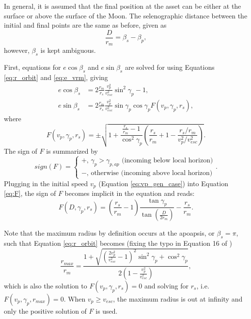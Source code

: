 \documentclass{article}
\begin{document}
In general, it is assumed that the final position at the asset can be either at the surface or above the surface of the Moon. The selenographic distance between the initial and final points are the same as before, given as
\begin{equation}\label{eq:D_beta_gen}
\frac{D}{r_m} = \beta_s - \beta_p,
\end{equation}
however, $\beta_s$ is kept ambiguous.

First, equations for $e\cos\beta_s$ and $e\sin\beta_s$ are solved for using Equations \eqref{eq:r_orbit} and \eqref{eq:e_vrm}, giving
\begin{align}\label{eq:ecosbetas}
e\cos\beta_s &= 2\frac{r_m}{r_s}\frac{v_p^2}{v_{esc}^2}\sin^2\gamma_p - 1,\\
e\sin\beta_s &= 2\frac{r_m}{r_s}\frac{v_p^2}{v_{esc}^2}\sin\gamma_p\cos\gamma_p F(v_p,\gamma_p,r_s), \label{eq:esinbetas}
\end{align}
where
\begin{equation}\label{eq:F}
F(v_p,\gamma_p,r_s) = \pm\sqrt{1 + \frac{\frac{r_s}{r_m}-1}{\cos^2\gamma_p}\left(\frac{r_s}{r_m}+1-\frac{r_s/r_m}{v_p^2/v_{esc}^2}\right)}.
\end{equation}
The sign of $F$ is summarized by
\begin{equation}\label{eq:sign of F} %
sign(F) = \begin{cases}
+ \text{, $\gamma_p > \gamma_{p,ap}$ (incoming below local horizon)}\\
- \text{, otherwise (incoming above local horizon)}
\end{cases}.
\end{equation}
Plugging in the initial speed $v_p$ (Equation \eqref{eq:vp_gen_case}) into Equation \eqref{eq:F}, the sign of $F$ becomes implicit in the equation and reads:
\begin{equation}
F(D,\gamma_p,r_s) = \left(\frac{r_s}{r_m}-1\right)\frac{\tan\gamma_p}{\tan\left(\frac{D}{2r_m}\right)} - \frac{r_s}{r_m}.
\end{equation}

Note that the maximum radius by definition occurs at the apoapsis, or $\beta_s=\pi$, such that Equation \eqref{eq:r_orbit} becomes (fixing the typo in Equation 16 of \cite{gault1963spray})
\begin{equation}\label{eq:rmax}
\frac{r_{max}}{r_m} = \frac{1 + \sqrt{\left(\frac{2v_p^2}{v_{esc}^2}-1\right)^2\sin^2\gamma_p+\cos^2\gamma_p}}{2\left(1-\frac{v_p^2}{v_{esc}^2}\right)},
\end{equation}
which is also the solution to $F(v_p,\gamma_p,r_s) = 0$ and solving for $r_s$, i.e.\ $F(v_p,\gamma_p,r_{max}) = 0$. When $v_p \ge v_{esc}$, the maximum radius is out at infinity and only the positive solution of $F$ is used.
\end{document}

